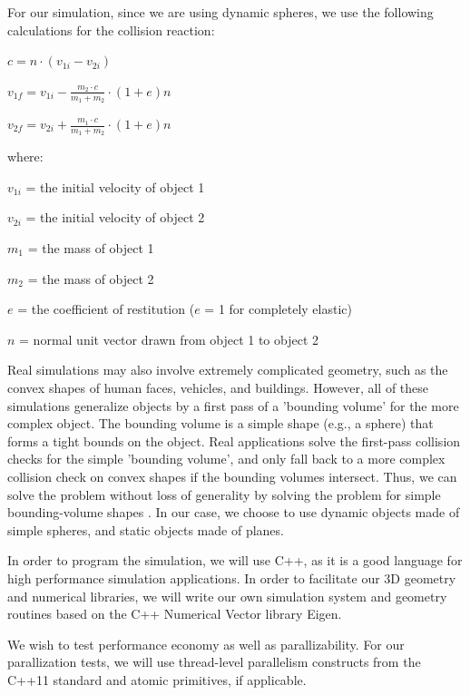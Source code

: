 \documentclass[conference]{IEEEtran}
\begin{document}
For our simulation, since we are using dynamic spheres, we use the following calculations for the collision reaction\cite{wheatchex}:

\begin{math}
c = n \cdot (v_{1i} - v_{2i})
\end{math}

\begin{math}
v_{1f} = v_{1i} - \frac{m_2 \cdot c}{m_1 + m_2} \cdot (1 + e)n
\end{math}

\begin{math}
v_{2f} = v_{2i} + \frac{m_1 \cdot c}{m_1 + m_2} \cdot (1 + e)n
\end{math}

where:

$v_{1i}$ = the initial velocity of object 1

$v_{2i}$ = the initial velocity of object 2

$m_1$ = the mass of object 1

$m_2$ = the mass of object 2

$e$ = the coefficient of restitution ($e$ = 1 for completely elastic)

$n$ = normal unit vector drawn from object 1 to object 2


Real simulations may also involve extremely complicated geometry, such as the convex shapes of human faces, vehicles, and buildings.  However, 
all of these simulations generalize objects by a first pass of a 'bounding volume' for the more complex object.  The bounding volume is a simple shape (e.g., a sphere)
that forms a tight bounds on the object.  Real applications solve the first-pass collision checks for the simple 'bounding volume', and only fall back to a more complex
collision check on convex shapes if the bounding volumes intersect.  Thus, we can solve the problem without loss of generality by solving the problem
for simple bounding-volume shapes \cite{uberflow,cloth}.  In our case, we choose to use dynamic objects made of simple spheres, and static objects made of planes.

In order to program the simulation, we will use C++, as it is a good language for high performance simulation applications.  In order to facilitate our 
3D geometry and numerical libraries, we will write our own simulation system and geometry routines based on the C++ Numerical Vector library Eigen.  

We wish to test performance economy as well as parallizability.  For our parallization tests, we will use thread-level parallelism constructs from the C++11 standard and atomic primitives, if applicable.
\end{document}
